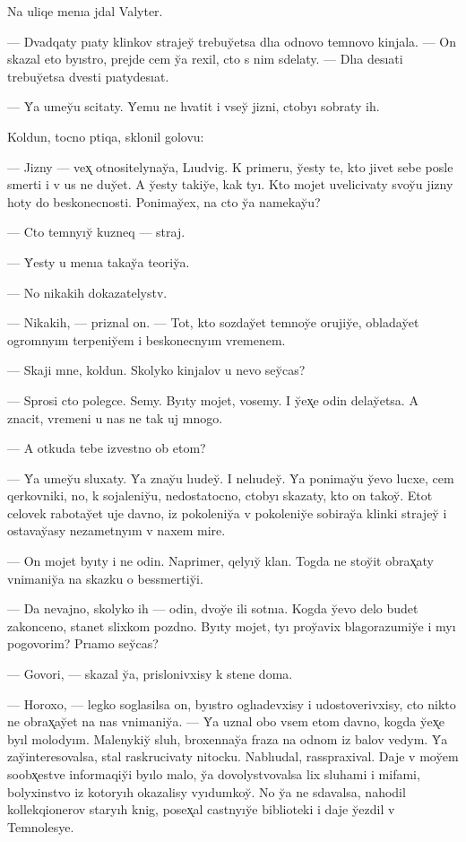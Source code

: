 \documentclass[10pt]{book}
\begin{document}
Na uliqe menıa jdal Valyter.

— Dvadqaty pıaty klinkov strajey̆ trebuy̆etsa dlıa odnovo temnovo kinjala. — On skazal eto byıstro, prejde cem y̆a rexil, cto s nim sdelaty. — Dlıa desıati trebuy̆etsa dvesti pıatydesıat.

— Y̆a umey̆u scitaty. Y̆emu ne hvatit i vsey̆ jizni, ctobyı sobraty ih.

Koldun, tocno ptiqa, sklonil golovu:

— Jizny — vex̨ otnositelynay̆a, Lıudvig. K primeru, y̆esty te, kto jivet sebe posle smerti i v us ne duy̆et. A y̆esty takiy̆e, kak tyı. Kto mojet uvelicivaty svoy̆u jizny hoty do beskonecnosti. Ponimay̆ex, na cto y̆a namekay̆u?

— Cto temnyıy̆ kuzneq — straj.

— Y̆esty u menıa takay̆a teoriy̆a.

— No nikakih dokazatelystv.

— Nikakih, — priznal on. — Tot, kto sozday̆et temnoy̆e orujiy̆e, obladay̆et ogromnyım terpeniy̆em i beskonecnyım vremenem.

— Skaji mne, koldun. Skolyko kinjalov u nevo sey̆cas?

— Sprosi cto polegce. Semy. Byıty mojet, vosemy. I y̆ex̨e odin delay̆etsa. A znacit, vremeni u nas ne tak uj mnogo.

— A otkuda tebe izvestno ob etom?

— Y̆a umey̆u sluxaty. Y̆a znay̆u lıudey̆. I nelıudey̆. Y̆a ponimay̆u y̆evo lucxe, cem qerkovniki, no, k sojaleniy̆u, nedostatocno, ctobyı skazaty, kto on takoy̆. Etot celovek rabotay̆et uje davno, iz pokoleniy̆a v pokoleniy̆e sobiray̆a klinki strajey̆ i ostavay̆asy nezametnyım v naxem mire.

— On mojet byıty i ne odin. Naprimer, qelyıy̆ klan. Togda ne stoy̆it obrax̨aty vnimaniy̆a na skazku o bessmertiy̆i.

— Da nevajno, skolyko ih — odin, dvoy̆e ili sotnıa. Kogda y̆evo delo budet zakonceno, stanet slixkom pozdno. Byıty mojet, tyı proy̆avix blagorazumiy̆e i myı pogovorim? Prıamo sey̆cas?

— Govori, — skazal y̆a, prislonivxisy k stene doma.

— Horoxo, — legko soglasilsa on, byıstro oglıadevxisy i udostoverivxisy, cto nikto ne obrax̨ay̆et na nas vnimaniy̆a. — Y̆a uznal obo vsem etom davno, kogda y̆ex̨e byıl molodyım. Malenykiy̆ sluh, broxennay̆a fraza na odnom iz balov vedym. Y̆a zay̆interesovalsa, stal raskrucivaty nitocku. Nablıudal, rasspraxival. Daje v moy̆em soobx̨estve informaqiy̆i byılo malo, y̆a dovolystvovalsa lix sluhami i mifami, bolyxinstvo iz kotoryıh okazalisy vyıdumkoy̆. No y̆a ne sdavalsa, nahodil kollekqionerov staryıh knig, posex̨al castnyıy̆e biblioteki i daje y̆ezdil v Temnolesye.
\end{document}
